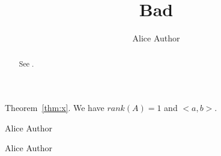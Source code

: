\documentclass{article}
\begin{document}
\begin{frontmatter}
\title{Bad}
\author[a]{Alice Author}
\begin{abstract}
See \cite{missing}.
\end{abstract}
\end{frontmatter}
Theorem~\ref{thm:x}.
We have $rank(A) = 1$ and $<a,b>$.


\begin{tocauthors}
\begin{tocinfo}[a] Alice Author \end{tocinfo}
\end{tocauthors}
\begin{tocaboutauthors}
\begin{tocabout}[wrong] Alice Author \end{tocabout}
\end{tocaboutauthors}
\end{document}
